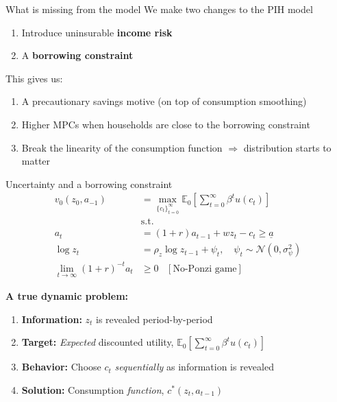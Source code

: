 \documentclass[
  10pt,
  ignorenonframetext,
  aspectratio=43,
  english,
]{beamer}
\providecommand{\tightlist}{%
  \setlength{\itemsep}{0pt}\setlength{\parskip}{0pt}}
\begin{document}
\begin{frame}{What is missing from the model}
\protect{}\label{what-is-missing-from-the-model}
We make two changes to the PIH model

\begin{enumerate}
\tightlist
\item Introduce uninsurable \textbf{income risk}
\item A \textbf{borrowing constraint}
\end{enumerate}

This gives us:

\begin{enumerate}
\tightlist
\item A precautionary savings motive (on top of consumption smoothing)
\item Higher MPCs when households are close to the borrowing constraint
\item Break the linearity of the consumption function \(\Rightarrow\) distribution starts to matter
\end{enumerate}
\end{frame}

\begin{frame}{Uncertainty and a borrowing constraint}
\protect{}\label{uncertainty-and-a-borrowing-constraint}
\[
\begin{aligned}
v_{0}(z_{0},a_{-1}) & =\max_{\{c_{t}\}^{\infty}_{t=0}}\mathbb{E}_{0}\left[\sum^{\infty}_{t=0}\beta^{t}u(c_{t})\right]\\
& \text{s.t.}\\
a_{t} & =(1+r)a_{t-1}+wz_{t}-c_{t}  \geq \underline{a} \\
\log z_{t} & = \rho_{z} \log z_{t-1} + \psi_{t},\quad \psi_{t}\sim\mathcal{N}(0,\sigma^{2}_{\psi})\\
\lim_{t\rightarrow\infty}(1+r)^{-t}a_{t} & \geq0\,\,\,\,\,[\text{No-Ponzi game}]
\end{aligned}
\]

\textbf{A true dynamic problem:}

\begin{enumerate}
\tightlist
\item
  \textbf{Information:} \(z_{t}\) is revealed period-by-period
\item
  \textbf{Target:} \emph{Expected} discounted utility,
  \(\mathbb{E}_{0}\left[\sum^{\infty}_{t=0}\beta^{t}u(c_{t})\right]\)
\item
  \textbf{Behavior:} Choose \(c_{t}\) \emph{sequentially} as information
  is revealed
\item
  \textbf{Solution:} Consumption \emph{function},
  \(c^{\ast}(z_{t},a_{t-1})\)
\end{enumerate}
\end{frame}
\end{document}
